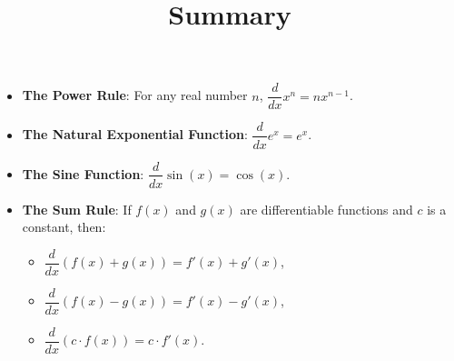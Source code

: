 \documentclass{ximera}
\title[Summary]{Summary}
\begin{document}
\begin{abstract} \end{abstract}
\maketitle


\begin{itemize}
	\item \textbf{The Power Rule}: For any real number $n$, $\displaystyle \dfrac{d}{dx} x^n = n x^{n-1}$.
	\item \textbf{The Natural Exponential Function}: $\displaystyle \dfrac{d}{dx} e^x = e^x$.
	\item \textbf{The Sine Function}: $\displaystyle \dfrac{d}{dx} \sin(x) = \cos(x)$.
		
	\item \textbf{The Sum Rule}: If $f(x)$ and $g(x)$ are differentiable functions and $c$ is a constant, then:
		\begin{itemize}
			\item $\displaystyle \dfrac{d}{dx}\left( f(x) + g(x) \right) = f'(x) + g'(x)$,
			\item $\displaystyle \dfrac{d}{dx}\left( f(x) - g(x) \right) = f'(x) - g'(x)$,
			\item $\displaystyle \dfrac{d}{dx}\left( c \cdot f(x) \right) = c \cdot f'(x)$.			
		\end{itemize}
\end{itemize}
\end{document}
